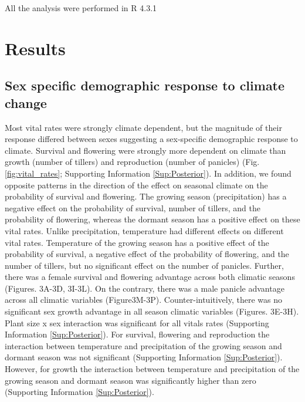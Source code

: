 \documentclass[12pt]{article}
\begin{document}
All the analysis were performed in R 4.3.1 \citep{RCoreteam}

\section*{Results}
\subsection*{Sex specific demographic response to climate change}
Most vital rates were strongly climate dependent, but the magnitude of their response differed between sexes suggesting a sex-specific demographic response to climate. 
Survival and flowering were strongly more dependent on climate than growth (number of tillers) and reproduction (number of panicles) (Fig.\ref{fig:vital_rates}; Supporting Information \ref{Sup:Posterior}).
In addition, we found opposite patterns in the direction of the effect on seasonal climate on the probability of survival and flowering.
The growing season (precipitation) has a negative effect on the probability of survival, number of tillers, and the probability of flowering, whereas the dormant season has a positive effect on these vital rates. 
Unlike precipitation, temperature had different effects on different vital rates.
Temperature of the growing season has a positive effect of the probability of survival, a negative effect of the probability of flowering, and the number of tillers, but no significant effect on the number of panicles. 
Further, there was a female survival and flowering advantage across both climatic seasons (Figures. 3A-3D, 3I-3L). 
On the contrary, there was a male panicle advantage across all climatic variables (Figure3M-3P). 
Counter-intuitively, there was no significant sex growth advantage in all season climatic variables (Figures. 3E-3H). 
Plant size x sex interaction was significant for all vitals rates (Supporting Information \ref{Sup:Posterior}).
For survival, flowering and reproduction the interaction between temperature and precipitation of the growing season and dormant season was not significant (Supporting Information \ref{Sup:Posterior}). 
However, for growth the interaction between temperature and precipitation of the growing season and dormant season was significantly higher than zero (Supporting Information \ref{Sup:Posterior}). 
\end{document}
